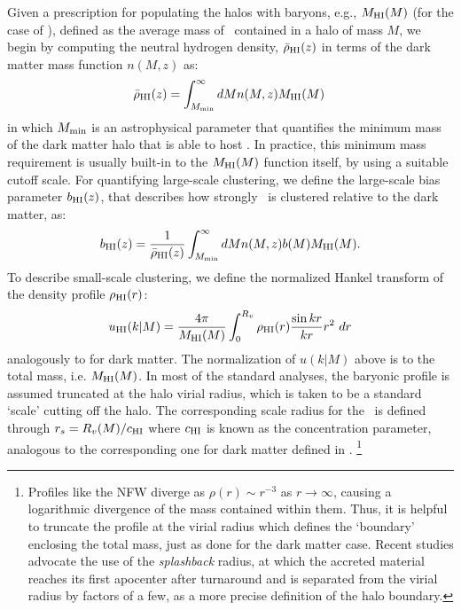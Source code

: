 Given a prescription for populating the halos with baryons, e.g., $M_{\rm HI}(M)$ (for the case of \HI), defined as the average mass of \HI\ contained in a halo of mass $M$, we begin by computing the neutral hydrogen density, $\bar{\rho}_{\rm HI}(z)$ in terms of the dark matter mass function $n(M,z)$ as:
\begin{equation}
\bar{\rho}_{\rm HI}(z)= \int_{M_{\rm min}}^{\infty} dM n(M,z) M_{\rm HI}(M) \,
\end{equation}
in which $M_{\rm min}$ is an astrophysical parameter that quantifies the minimum mass of the dark matter halo that is able to host \HI. In practice, this minimum mass requirement is usually built-in to the $M_{\rm HI}(M)$ function itself, by using a suitable cutoff scale.
For quantifying large-scale clustering, we define the large-scale bias parameter $b_{\rm HI} (z)$, that describes how strongly \HI\ is clustered relative to the dark matter,  as:
\begin{equation}
b_{\rm HI} (z) = \frac{1}{\bar{\rho}_{\rm HI}(z)}\int_{M_{\rm min}}^{\infty} dM
n(M,z) b(M) M_{\rm HI}(M).
\label{biasHI}
\end{equation}
To describe small-scale clustering, we define the normalized Hankel transform of the density profile $\rho_{\rm HI} (r)$:
 \begin{equation}
 u_{\rm HI}(k|M) = \frac{4 \pi}{M_{\rm HI} (M)} \int_0^{R_v} \rho_{\rm HI}(r) \frac{\sin kr}{kr} r^2 \ dr
\end{equation}
analogously to  for dark matter. The 
normalization of $u(k|M)$ above is to the total \HI{} mass, i.e. $M_{\rm HI} (M)$. In most of the standard analyses, the baryonic profile is assumed truncated at the halo virial radius, which is taken to be a standard `scale' cutting off the halo. The corresponding scale radius for the \HI\ is defined through $r_s = R_v(M)/c_{\rm HI}$ where $c_{\rm HI}$ is known as the  concentration parameter, analogous to the corresponding one for dark matter defined in . \footnote{Profiles like the NFW diverge as $\rho(r) \sim r^{-3}$ as $r \to \infty$, causing a logarithmic divergence of the mass contained within them. Thus, it is helpful to truncate the profile at the virial radius which defines the `boundary' enclosing the total mass, just as done for the dark matter case. Recent studies advocate the use of the \textit{splashback} radius, at which the accreted material reaches its first apocenter after turnaround \cite{diemer2018} and is separated from the virial radius by factors of a few, as a more precise definition of the halo boundary.}


